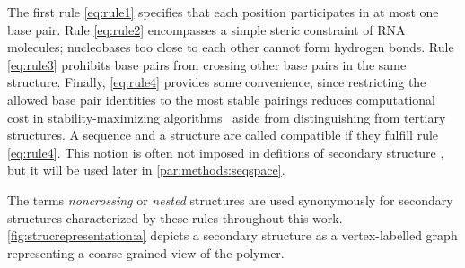 \documentclass[../../master.tex]{subfiles}
\begin{document}
The first rule \ref{eq:rule1} specifies that each position participates in at most one base pair.
Rule \ref{eq:rule2} encompasses a simple steric constraint of RNA molecules; nucleobases too close to each other cannot form hydrogen bonds.
Rule \ref{eq:rule3} prohibits base pairs from crossing other base pairs in the same structure.
Finally, \ref{eq:rule4} provides some convenience, since restricting the allowed base pair identities to the most stable pairings reduces computational cost in stability-maximizing algorithms~\parencite{zuker_rna_1984, flamm_rna_1999} aside from distinguishing from tertiary structures.
A sequence and a structure are called compatible if they fulfill rule \ref{eq:rule4}.
This notion is often not imposed in defitions of secondary structure \parencite{hofacker_combinatorics_1998}, but it will be used later in \autoref{par:methods:seqspace}.

The terms \emph{noncrossing} or \emph{nested} structures are used synonymously for secondary structures characterized by these rules throughout this work.
\autoref{fig:strucrepresentation:a} depicts a secondary structure as a vertex-labelled graph representing a coarse-grained view of the polymer. 

\end{document}
